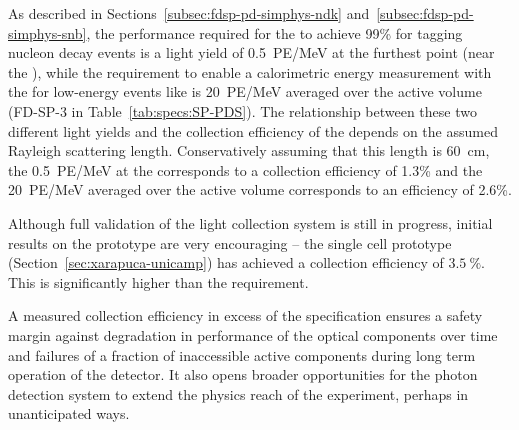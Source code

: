 As described in Sections~\ref{subsec:fdsp-pd-simphys-ndk} and~\ref{subsec:fdsp-pd-simphys-snb}, the performance required for the  to achieve 99\% for tagging nucleon decay events is a light yield of \SI{0.5}{PE/MeV} at the furthest point (near the ), while the requirement to enable a calorimetric energy measurement with the  for low-energy events like  is \SI{20}{PE/MeV} averaged over the active volume (FD-SP-3 in Table~\ref{tab:specs:SP-PDS}). The relationship between these two different light yields and the collection efficiency of the  depends on the assumed Rayleigh scattering length. Conservatively assuming that this length is \SI{60}{cm}, the \SI{0.5}{PE/MeV} at the  corresponds to a collection efficiency of 1.3\% and the \SI{20}{PE/MeV} averaged over the active volume corresponds to an efficiency of 2.6\%.

Although full validation of the   light collection system is still in progress, initial results on the  prototype are very encouraging -- the single cell prototype (Section~\ref{sec:xarapuca-unicamp}) has achieved a collection efficiency of $\SI{3.5}{\%}$.  This is significantly higher than the requirement.

A measured collection efficiency in excess of the specification ensures a safety margin against degradation in performance of the optical components over time and failures of a fraction of inaccessible active components during long term operation of the detector. It also opens broader opportunities for the photon detection system to extend the physics reach of the experiment, perhaps in unanticipated ways.

